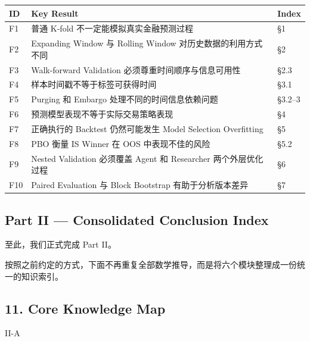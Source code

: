 \begin{readertable}
\begin{longtable}[]{@{}
  >{\raggedright\arraybackslash}p{}
  >{\raggedright\arraybackslash}p{}
  >{\raggedright\arraybackslash}p{}@{}}
\toprule
ID & Key Result & Index \\
\midrule
\endhead
F1 & 普通 K-fold 不一定能模拟真实金融预测过程 & §1 \\
F2 & Expanding Window 与 Rolling Window 对历史数据的利用方式不同 & §2 \\
F3 & Walk-forward Validation 必须尊重时间顺序与信息可用性 & §2.3 \\
F4 & 样本时间戳不等于标签可获得时间 & §3.1 \\
F5 & Purging 和 Embargo 处理不同的时间信息依赖问题 & §3.2--3 \\
F6 & 预测模型表现不等于实际交易策略表现 & §4 \\
F7 & 正确执行的 Backtest 仍然可能发生 Model Selection Overfitting & §5 \\
F8 & PBO 衡量 IS Winner 在 OOS 中表现不佳的风险 & §5.2 \\
F9 & Nested Validation 必须覆盖 Agent 和 Researcher 两个外层优化过程 & §6 \\
F10 & Paired Evaluation 与 Block Bootstrap 有助于分析版本差异 & §7 \\
\bottomrule
\end{longtable}
\end{readertable}

\hypertarget{part-2-27-0001-part-ii-consolidated-conclusion-index}{%
\subsection{Part II --- Consolidated Conclusion Index}\label{part-2-27-0001-part-ii-consolidated-conclusion-index}}

至此，我们正式完成 Part II。

按照之前约定的方式，下面不再重复全部数学推导，而是将六个模块整理成一份统一的知识索引。

\hypertarget{part-2-27-0001-core-knowledge-map}{%
\subsection{11. Core Knowledge Map}\label{part-2-27-0001-core-knowledge-map}}

II-A

